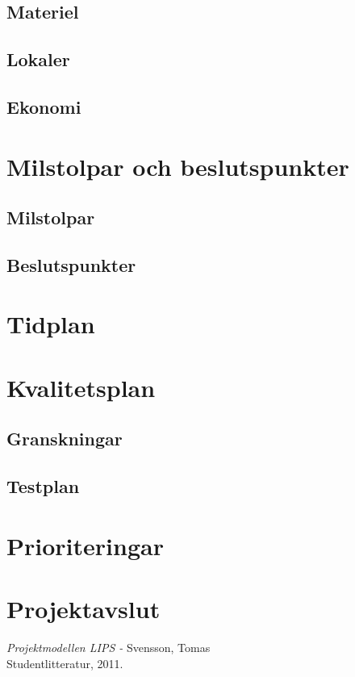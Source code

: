 \documentclass[a4paper,12pt]{article}
\begin{document}
\subsection{Materiel}
\subsection{Lokaler}
\subsection{Ekonomi}


\section{Milstolpar och beslutspunkter} %
\subsection{Milstolpar}

\subsection{Beslutspunkter}

\section{Tidplan}

\section{Kvalitetsplan}	%
\subsection{Granskningar}
\subsection{Testplan}
\section{Prioriteringar}
\section{Projektavslut} %
\newpage
\appendix

\newpage


\begin{thebibliography}{99}
\textit{Projektmodellen LIPS - } Svensson, Tomas
\\Studentlitteratur, 2011.
\end{thebibliography}
\end{document}

